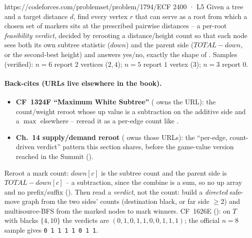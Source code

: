 \begin{practiceset}
    {https://codeforces.com/problemset/problem/1794/E}{CF 2400 · L5}
    {Given a tree and a target distance $d$, find every vertex $r$ that can serve
    as a root from which a chosen set of markers sits at the prescribed pairwise
    distances -- a per-root \emph{feasibility verdict}, decided by rerooting a
    distance/height count so that each node sees both its own subtree statistic
    ($\mathit{down}$) and the parent side ($\mathit{TOTAL}-\mathit{down}$, or the
    second-best height) and answers yes/no, exactly the shape of
    . Samples (verified): $n=6$ report $2$ vertices
    ($2,4$); $n=5$ report $1$ vertex ($3$); $n=3$ report $0$.
    }
\end{practiceset}

\paragraph{Back-cites (URLs live elsewhere in the book).}
\begin{itemize}[nosep,leftmargin=1.4em]
  \item \textbf{CF~1324F ``Maximum White Subtree''} ( owns the URL): the
        count/weight reroot whose up value is a subtraction on the additive side
        and a $\max$ elsewhere -- reread it as a per-edge count like
        .
  \item \textbf{Ch.~14 supply/demand reroot} ( owns those URLs): the
        ``per-edge, count-driven verdict'' pattern this section shares, before the
        game-value version reached in the Summit ().
\end{itemize}

\begin{recallbox}
Reroot a mark count: $\mathit{down}[c]$ is the subtree count and the parent side is
$\mathit{TOTAL}-\mathit{down}[c]$ -- a subtraction, since the combine is a sum, so
no up array and no prefix/suffix (). Then read a
\emph{verdict}, not the count: build a \emph{directed} safe-move graph from the two
sides' counts (destination black, or far side $\ge 2$) and multisource-BFS from the
marked nodes to mark winners. CF~1626E (): on $T$ with
blacks $\{4,10\}$ the verdicts are $(0,1,0,1,1,0,0,1,1,1)$; the official $n=8$
sample gives \texttt{0 1 1 1 1 0 1 1}.
\end{recallbox}
